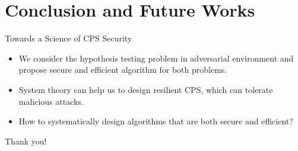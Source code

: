 \documentclass[10pt]{beamer}
\begin{document}
  \section{Conclusion and Future Works}

  \begin{frame}{Towards a Science of CPS Security}
    \begin{itemize}
      \item We consider the hypothesis testing problem in adversarial environment and propose secure and efficient algorithm for both problems.
      \item System theory can help us to design resilient CPS, which can tolerate malicious attacks.
      \item How to systematically design algorithms that are both secure and efficient?
    \end{itemize}
  \end{frame}

  \begin{frame}[standout]
    Thank you!
  \end{frame}
\end{document}
